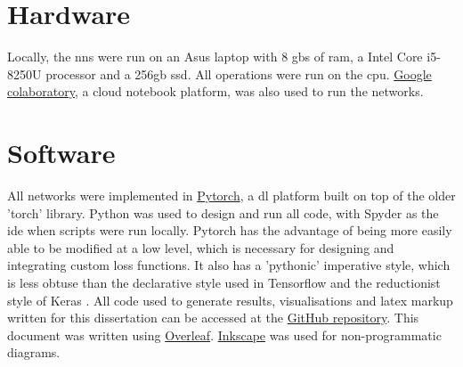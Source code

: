 
\section{Hardware}

Locally, the \gls{nn}s were run on an Asus laptop with 8 \gls{gb}s of \gls{ram}, a Intel Core i5-8250U processor and a 256\gls{gb} \gls{ssd}. All operations were run on the \gls{cpu}. \href{https://colab.research.google.com/}{Google colaboratory}, a cloud notebook platform, was also used to run the networks. 

\section{Software}

All networks were implemented in \href{https://pytorch.org/}{Pytorch}, a \gls{dl} platform built on top of the older 'torch' library. Python was used to design and run all code, with Spyder as the \gls{ide} when scripts were run locally. Pytorch has the advantage of being more easily able to be modified at a low level, which is necessary for designing and integrating custom loss functions. It also has a 'pythonic' imperative style, which is less obtuse than the declarative style used in Tensorflow and the reductionist style of Keras \cite{tale_dl}. All code used to generate results, visualisations and latex markup written for this dissertation can be accessed at the \href{https://github.com/MattSkiff/Flip-Probability-as-a-Loss-Function-in-Convolutional-Neural-Networks-for-Image-Classification}{GitHub repository}. This document was written using \href{https://www.overleaf.com/}{Overleaf}. \href{https://inkscape.org/}{Inkscape} was used for non-programmatic diagrams.
